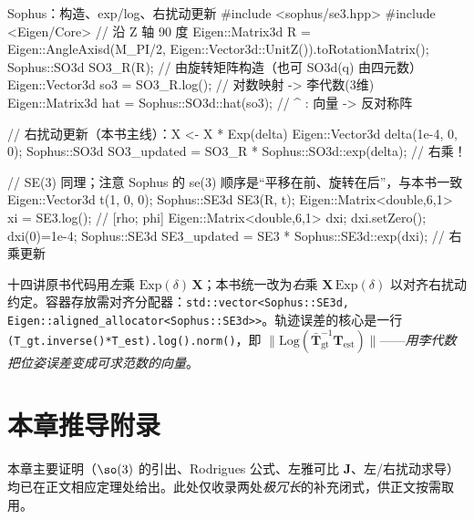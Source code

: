 \begin{codebox}[C++]{Sophus：构造、exp/log、右扰动更新}
#include <sophus/se3.hpp>
#include <Eigen/Core>
// 沿 Z 轴 90 度
Eigen::Matrix3d R = Eigen::AngleAxisd(M_PI/2, Eigen::Vector3d::UnitZ()).toRotationMatrix();
Sophus::SO3d SO3_R(R);                 // 由旋转矩阵构造（也可 SO3d(q) 由四元数）
Eigen::Vector3d so3 = SO3_R.log();     // 对数映射 -> 李代数(3维)
Eigen::Matrix3d hat = Sophus::SO3d::hat(so3);   // ^ : 向量 -> 反对称阵

// 右扰动更新（本书主线）：X <- X * Exp(delta)
Eigen::Vector3d delta(1e-4, 0, 0);
Sophus::SO3d SO3_updated = SO3_R * Sophus::SO3d::exp(delta);   // 右乘！

// SE(3) 同理；注意 Sophus 的 se(3) 顺序是“平移在前、旋转在后”，与本书一致
Eigen::Vector3d t(1, 0, 0);
Sophus::SE3d SE3(R, t);
Eigen::Matrix<double,6,1> xi = SE3.log();        // [rho; phi]
Eigen::Matrix<double,6,1> dxi; dxi.setZero(); dxi(0)=1e-4;
Sophus::SE3d SE3_updated = SE3 * Sophus::SE3d::exp(dxi);       // 右乘更新
\end{codebox}

\begin{note}
十四讲原书代码用\emph{左}乘 $\mathrm{Exp}(\delta)\,\mathbf{X}$；本书统一改为\emph{右}乘 $\mathbf{X}\,\mathrm{Exp}(\delta)$ 以对齐右扰动约定。容器存放需对齐分配器：\texttt{std::vector<Sophus::SE3d, Eigen::aligned\_allocator<Sophus::SE3d>>}。轨迹误差的核心是一行 \texttt{(T\_gt.inverse()*T\_est).log().norm()}，即 $\|\mathrm{Log}(\bar{\mathbf{T}}_{\text{gt}}^{-1}\mathbf{T}_{\text{est}})\|$——\emph{用李代数把位姿误差变成可求范数的向量}。
\end{note}

\section{本章推导附录}
\label{sec:lie-appendix}

本章主要证明（$\so(3)$ 的引出、Rodrigues 公式、左雅可比 $\mathbf{J}$、左/右扰动求导）均已在正文相应定理处给出。此处仅收录两处\emph{极冗长}的补充闭式，供正文按需取用。

